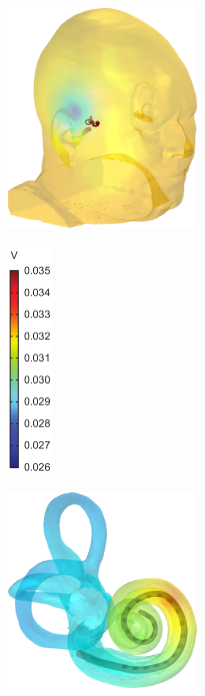 \begin{figure}
    \centering
    
    \begin{subfigure}[t]{0.4\textwidth}
        \centering
        \includegraphics[width=5cm]{Simulations/BCs/HeadVoltage}
        \caption{}
        \label{fig:bc_voltage_head}
    \end{subfigure}%
    \begin{subfigure}[t]{0.1\textwidth}
        \centering
        \includegraphics[height=6cm]{Simulations/BCs/legend_head_volt}
    \end{subfigure}%
    \hfill%
    \begin{subfigure}[t]{0.4\textwidth}
        \centering
        \includegraphics[width=5cm]{Simulations/BCs/CochleaVoltage}
        \caption{}
        \label{fig:bc_voltage_coh}
    \end{subfigure}%

\end{figure}
